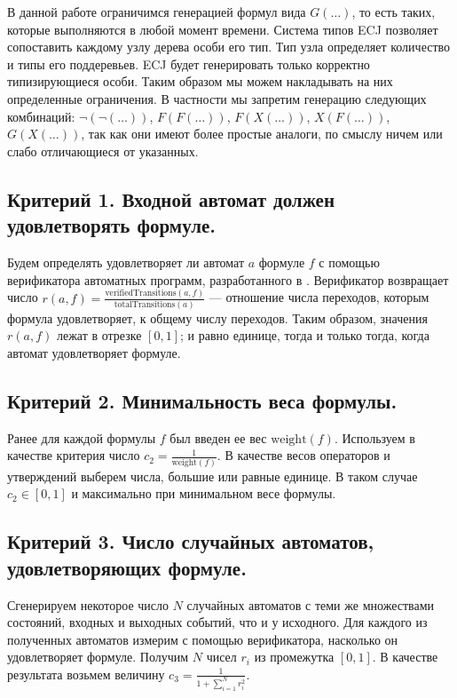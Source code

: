 \documentclass[12pt,fleqn]{article}
\begin{document}
В данной работе ограничимся генерацией формул вида $G(\ldots)$, то есть таких, которые выполняются в любой момент времени.
Система типов ECJ позволяет сопоставить каждому узлу дерева особи его тип. Тип узла
определяет количество и типы его поддеревьев. ECJ будет генерировать только корректно типизирующиеся особи.
Таким образом мы можем накладывать на них определенные ограничения. В частности мы запретим генерацию следующих
комбинаций: $\lnot(\lnot(\ldots))$, $F(F(\ldots))$, $F(X(\ldots))$, $X(F(\ldots))$, $G(X(\ldots))$, так как
они имеют более простые аналоги, по смыслу ничем или слабо отличающиеся от указанных.

\subsection{Критерий 1. Входной автомат должен удовлетворять формуле.}

Будем определять удовлетворяет ли автомат $a$ формуле $f$ с помощью верификатора автоматных программ, разработанного в \cite{eg}.
Верификатор возвращает число $r(a, f) = \frac{\text{verifiedTransitions}(a, f)}{\text{totalTransitions}(a)}$ --- отношение числа
переходов, которым формула удовлетворяет, к общему числу переходов. Таким образом, значения $r(a, f)$ лежат в отрезке $[0, 1]$; и равно
единице, тогда и только тогда, когда автомат удовлетворяет формуле.

\subsection{Критерий 2. Минимальность веса формулы.}

Ранее для каждой формулы $f$ был введен ее вес $\text{weight}(f)$. Используем в качестве критерия число $c_2 = \frac{1}{\text{weight}(f)}$.
В качестве весов операторов и утверждений выберем числа, большие или равные единице.
В таком случае $c_2 \in [0, 1]$ и максимально при минимальном весе формулы.

\subsection{Критерий 3. Число случайных автоматов, удовлетворяющих формуле.}

Сгенерируем некоторое число $N$ случайных автоматов с теми же множествами состояний, входных и выходных событий, что и
у исходного. Для каждого из полученных автоматов измерим с помощью верификатора, насколько он удовлетворяет формуле.
Получим $N$ чисел $r_i$ из промежутка $[0, 1]$. В качестве результата возьмем величину $c_3 = \frac{1}{1 + \sum_{i = 1}^{N}r_i^2}$.
\end{document}
